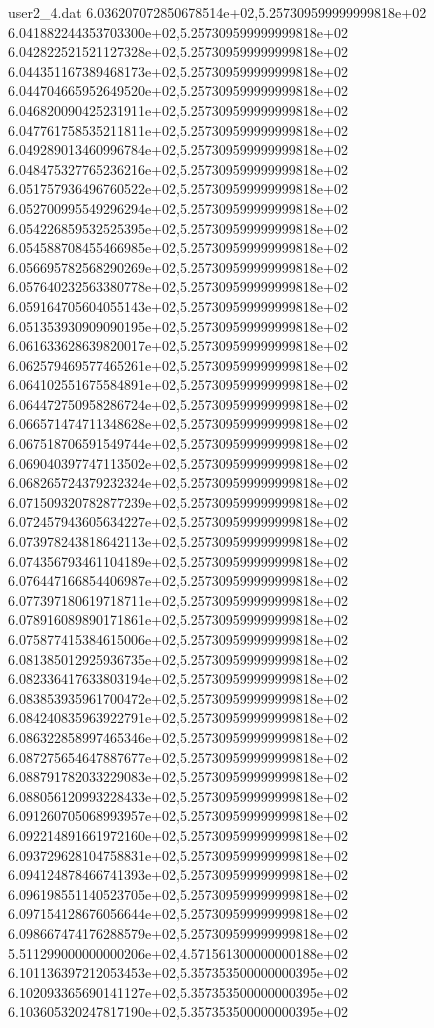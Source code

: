 \begin{filecontents}{user2_4.dat}
6.036207072850678514e+02,5.257309599999999818e+02
6.041882244353703300e+02,5.257309599999999818e+02
6.042822521521127328e+02,5.257309599999999818e+02
6.044351167389468173e+02,5.257309599999999818e+02
6.044704665952649520e+02,5.257309599999999818e+02
6.046820090425231911e+02,5.257309599999999818e+02
6.047761758535211811e+02,5.257309599999999818e+02
6.049289013460996784e+02,5.257309599999999818e+02
6.048475327765236216e+02,5.257309599999999818e+02
6.051757936496760522e+02,5.257309599999999818e+02
6.052700995549296294e+02,5.257309599999999818e+02
6.054226859532525395e+02,5.257309599999999818e+02
6.054588708455466985e+02,5.257309599999999818e+02
6.056695782568290269e+02,5.257309599999999818e+02
6.057640232563380778e+02,5.257309599999999818e+02
6.059164705604055143e+02,5.257309599999999818e+02
6.051353930909090195e+02,5.257309599999999818e+02
6.061633628639820017e+02,5.257309599999999818e+02
6.062579469577465261e+02,5.257309599999999818e+02
6.064102551675584891e+02,5.257309599999999818e+02
6.064472750958286724e+02,5.257309599999999818e+02
6.066571474711348628e+02,5.257309599999999818e+02
6.067518706591549744e+02,5.257309599999999818e+02
6.069040397747113502e+02,5.257309599999999818e+02
6.068265724379232324e+02,5.257309599999999818e+02
6.071509320782877239e+02,5.257309599999999818e+02
6.072457943605634227e+02,5.257309599999999818e+02
6.073978243818642113e+02,5.257309599999999818e+02
6.074356793461104189e+02,5.257309599999999818e+02
6.076447166854406987e+02,5.257309599999999818e+02
6.077397180619718711e+02,5.257309599999999818e+02
6.078916089890171861e+02,5.257309599999999818e+02
6.075877415384615006e+02,5.257309599999999818e+02
6.081385012925936735e+02,5.257309599999999818e+02
6.082336417633803194e+02,5.257309599999999818e+02
6.083853935961700472e+02,5.257309599999999818e+02
6.084240835963922791e+02,5.257309599999999818e+02
6.086322858997465346e+02,5.257309599999999818e+02
6.087275654647887677e+02,5.257309599999999818e+02
6.088791782033229083e+02,5.257309599999999818e+02
6.088056120993228433e+02,5.257309599999999818e+02
6.091260705068993957e+02,5.257309599999999818e+02
6.092214891661972160e+02,5.257309599999999818e+02
6.093729628104758831e+02,5.257309599999999818e+02
6.094124878466741393e+02,5.257309599999999818e+02
6.096198551140523705e+02,5.257309599999999818e+02
6.097154128676056644e+02,5.257309599999999818e+02
6.098667474176288579e+02,5.257309599999999818e+02
5.511299000000000206e+02,4.571561300000000188e+02
6.101136397212053453e+02,5.357353500000000395e+02
6.102093365690141127e+02,5.357353500000000395e+02
6.103605320247817190e+02,5.357353500000000395e+02

\end{filecontents}
